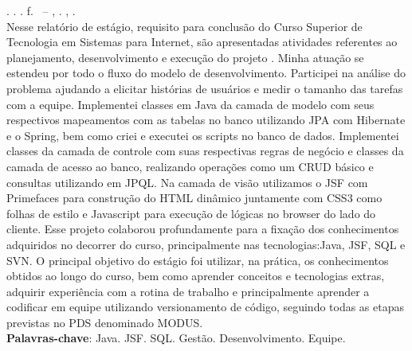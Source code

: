 
\begin{resumo}[RESUMO]
\begin{SingleSpacing}

\imprimirautorcitacao. \imprimirtitulo. \imprimirdata. \pageref {LastPage} f. \imprimirprojeto\ – \imprimirprograma, \imprimirinstituicao. \imprimirlocal, \imprimirdata.\\


Nesse relatório de estágio, requisito para conclusão do Curso Superior de Tecnologia em Sistemas para Internet, são apresentadas atividades referentes ao planejamento, desenvolvimento e execução do projeto \imprimirtitulo. Minha atuação se estendeu por todo o fluxo do modelo de desenvolvimento. Participei na análise do problema ajudando a elicitar histórias de usuários e medir o tamanho das tarefas com a equipe. Implementei classes em Java da camada de modelo com seus respectivos mapeamentos com as tabelas no banco utilizando JPA com Hibernate e o Spring, bem como criei e executei os scripts no banco de dados. Implementei classes da camada de controle com suas respectivas regras de negócio e classes da camada de acesso ao banco, realizando operações como um CRUD básico e consultas utilizando em JPQL. Na camada de visão utilizamos o JSF com Primefaces para construção do HTML dinâmico juntamente com CSS3 como folhas de estilo e Javascript para execução de lógicas no browser do lado do cliente. Esse projeto colaborou profundamente para a fixação dos conhecimentos adquiridos no decorrer do curso, principalmente nas tecnologias:Java, JSF, SQL e SVN. O principal objetivo do estágio foi utilizar, na prática, os conhecimentos obtidos ao longo do curso, bem como aprender conceitos e tecnologias extras, adquirir experiência com a rotina de trabalho e principalmente aprender a codificar em equipe utilizando versionamento de código, seguindo todas as etapas previstas no PDS denominado MODUS. \\

\textbf{Palavras-chave}: Java. JSF. SQL. Gestão. Desenvolvimento. Equipe.

\end{SingleSpacing}
\end{resumo}

